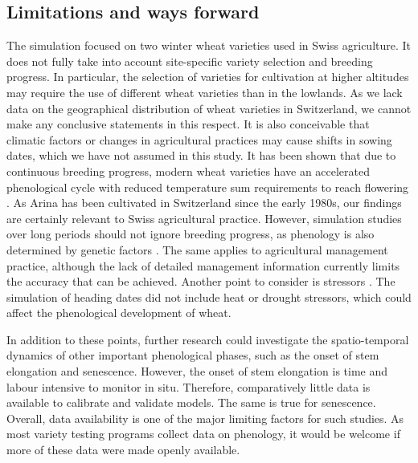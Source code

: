 \subsection{Limitations and ways forward}
The simulation focused on two winter wheat varieties used in Swiss agriculture. It does not fully take into account site-specific variety selection and breeding progress. In particular, the selection of varieties for cultivation at higher altitudes may require the use of different wheat varieties than in the lowlands. As we lack data on the geographical distribution of wheat varieties in Switzerland, we cannot make any conclusive statements in this respect. It is also conceivable that climatic factors or changes in agricultural practices may cause shifts in sowing dates, which we have not assumed in this study. It has been shown that due to continuous breeding progress, modern wheat varieties have an accelerated phenological cycle with reduced temperature sum requirements to reach flowering \citep{rezaei_climate_2018}. As Arina has been cultivated in Switzerland since the early 1980s, our findings are certainly relevant to Swiss agricultural practice. However, simulation studies over long periods should not ignore breeding progress, as phenology is also determined by genetic factors \citep{hyles_phenology_2020}. The same applies to agricultural management practice, although the lack of detailed management information currently limits the accuracy that can be achieved. Another point to consider is stressors \citep{perdomo_effects_2015}. The simulation of heading dates did not include heat or drought stressors, which could affect the phenological development of wheat.

In addition to these points, further research could investigate the spatio-temporal dynamics of other important phenological phases, such as the onset of stem elongation and senescence. However, the onset of stem elongation is time and labour intensive to monitor in situ. Therefore, comparatively little data is available to calibrate and validate models. The same is true for senescence. Overall, data availability is one of the major limiting factors for such studies. As most variety testing programs collect data on phenology, it would be welcome if more of these data were made openly available.

